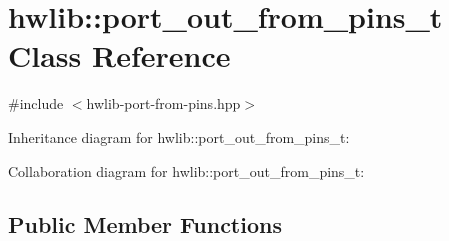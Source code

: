 \hypertarget{classhwlib_1_1port__out__from__pins__t}{}\section{hwlib\+:\+:port\+\_\+out\+\_\+from\+\_\+pins\+\_\+t Class Reference}
\label{classhwlib_1_1port__out__from__pins__t}


{\ttfamily \#include $<$hwlib-\/port-\/from-\/pins.\+hpp$>$}



Inheritance diagram for hwlib\+:\+:port\+\_\+out\+\_\+from\+\_\+pins\+\_\+t\+:


Collaboration diagram for hwlib\+:\+:port\+\_\+out\+\_\+from\+\_\+pins\+\_\+t\+:
\subsection*{Public Member Functions}

